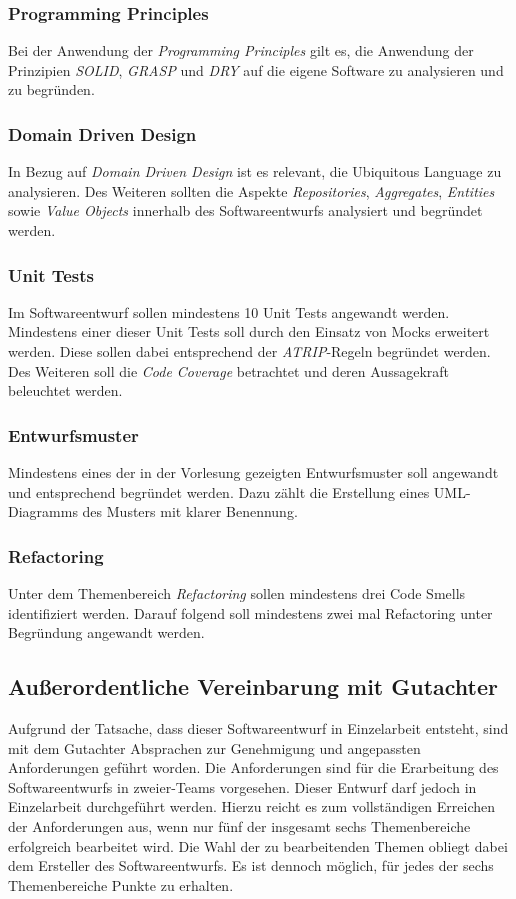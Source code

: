 \subsubsection*{Programming Principles}
Bei der Anwendung der \textit{Programming Principles} gilt es, die Anwendung der Prinzipien \textit{SOLID}, \textit{GRASP} und \textit{DRY} auf die eigene Software zu analysieren und zu begründen. 

\subsubsection*{Domain Driven Design}
In Bezug auf \textit{Domain Driven Design} ist es relevant, die Ubiquitous Language zu analysieren. 
Des Weiteren sollten die Aspekte \textit{Repositories}, \textit{Aggregates}, \textit{Entities} sowie \textit{Value Objects} innerhalb des Softwareentwurfs analysiert und begründet werden.

\subsubsection*{Unit Tests}
Im Softwareentwurf sollen mindestens 10 Unit Tests angewandt werden.
Mindestens einer dieser Unit Tests soll durch den Einsatz von Mocks erweitert werden.
Diese sollen dabei entsprechend der \textit{ATRIP}-Regeln begründet werden.
Des Weiteren soll die \textit{Code Coverage} betrachtet und deren Aussagekraft beleuchtet werden.

\subsubsection*{Entwurfsmuster}
Mindestens eines der in der Vorlesung gezeigten Entwurfsmuster soll angewandt und entsprechend begründet werden.
Dazu zählt die Erstellung eines UML-Diagramms des Musters mit klarer Benennung.

\subsubsection*{Refactoring}
Unter dem Themenbereich \textit{Refactoring} sollen mindestens drei Code Smells identifiziert werden.
Darauf folgend soll mindestens zwei mal Refactoring unter Begründung angewandt werden.

\subsection{Außerordentliche Vereinbarung mit Gutachter}
Aufgrund der Tatsache, dass dieser Softwareentwurf in Einzelarbeit entsteht, sind mit dem Gutachter Absprachen zur Genehmigung und angepassten Anforderungen geführt worden.
Die Anforderungen sind für die Erarbeitung des Softwareentwurfs in zweier-Teams vorgesehen.
Dieser Entwurf darf jedoch in Einzelarbeit durchgeführt werden.
Hierzu reicht es zum vollständigen Erreichen der Anforderungen aus, wenn nur fünf der insgesamt sechs Themenbereiche erfolgreich bearbeitet wird.
Die Wahl der zu bearbeitenden Themen obliegt dabei dem Ersteller des Softwareentwurfs.
Es ist dennoch möglich, für jedes der sechs Themenbereiche Punkte zu erhalten.

